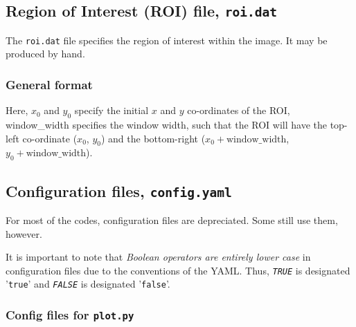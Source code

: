 \subsection{Region of Interest (ROI) file, \texttt{roi.dat}}
The \texttt{roi.dat} file specifies the region of interest within the image. It may be produced by hand.

\subsubsection{General format}


Here, $ x_0 $ and $ y_0 $ specify the initial $ x $ and $ y $ co-ordinates of the ROI, window\_width specifies the window width, such that the ROI will have the top-left co-ordinate ($ x_0 $, $ y_0 $) and the bottom-right ($ x_0 + \text{window\_width} $, $ y_0 + \text{window\_width} $).


\subsection{Configuration files, \texttt{config.yaml}}
For most of the codes, configuration files are depreciated. Some still use them, however.

It is important to note that \textit{Boolean operators are entirely lower case} in configuration files due to the conventions of the YAML. Thus, \texttt{\textit{TRUE}} is designated '\texttt{true}' and \texttt{\textit{FALSE}} is designated '\texttt{false}'.


\subsubsection{Config files for \texttt{plot.py}}

